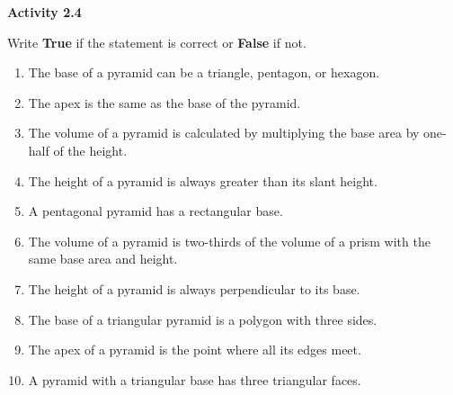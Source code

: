 \noindent\textbf{Activity 2.4}

\vspace{0.75ex}

Write \textbf{True} if the statement is correct or \textbf{False} if not.
\begin{enumerate}[noitemsep, label = \color{blue}\arabic*. ]
    \item The base of a pyramid can be a triangle, pentagon, or hexagon.
    \item The apex is the same as the base of the pyramid.
    \item The volume of a pyramid is calculated by multiplying the base area by one-half of the height.
    \item The height of a pyramid is always greater than its slant height.
    \item A pentagonal pyramid has a rectangular base.
    \item The volume of a pyramid is two-thirds of the volume of a prism with the same base area and height.
    \item The height of a pyramid is always perpendicular to its base.
    \item The base of a triangular pyramid is a polygon with three sides.
    \item The apex of a pyramid is the point where all its edges meet.
    \item A pyramid with a triangular base has three triangular faces.
\end{enumerate}

